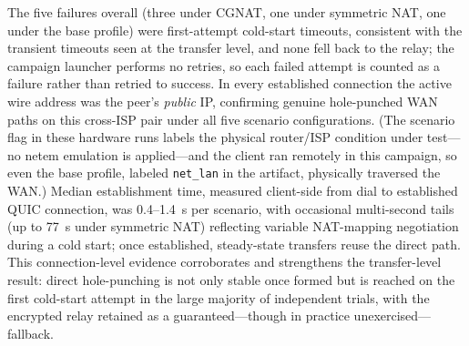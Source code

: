 ﻿\documentclass[journal]{IEEEtran}
\begin{document}
The five failures overall (three under CGNAT, one under symmetric NAT, one under the base profile) were first-attempt cold-start timeouts, consistent with the transient timeouts seen at the transfer level, and none fell back to the relay; the campaign launcher performs no retries, so each failed attempt is counted as a failure rather than retried to success. In every established connection the active wire address was the peer's \emph{public} IP, confirming genuine hole-punched WAN paths on this cross-ISP pair under all five scenario configurations. (The scenario flag in these hardware runs labels the physical router/ISP condition under test---no netem emulation is applied---and the client ran remotely in this campaign, so even the base profile, labeled \texttt{net\_lan} in the artifact, physically traversed the WAN.) Median establishment time, measured client-side from dial to established QUIC connection, was 0.4--1.4~s per scenario, with occasional multi-second tails (up to 77~s under symmetric NAT) reflecting variable NAT-mapping negotiation during a cold start; once established, steady-state transfers reuse the direct path. This connection-level evidence corroborates and strengthens the transfer-level result: direct hole-punching is not only stable once formed but is reached on the first cold-start attempt in the large majority of independent trials, with the encrypted relay retained as a guaranteed---though in practice unexercised---fallback.
\end{document}
